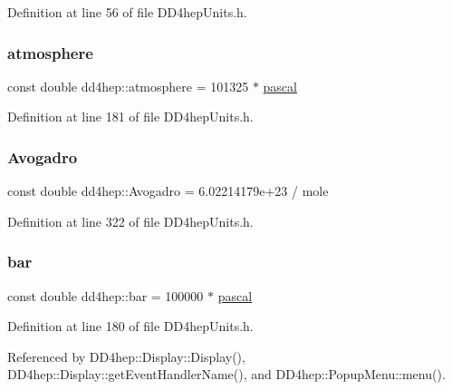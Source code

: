Definition at line 56 of file D\+D4hep\+Units.\+h.

\hypertarget{namespacedd4hep_a3907dd93dc8fc5b2f3b0fb9b92e46c5b}{}\label{namespacedd4hep_a3907dd93dc8fc5b2f3b0fb9b92e46c5b} 
\subsubsection{\texorpdfstring{atmosphere}{atmosphere}}
{\footnotesize\ttfamily const double dd4hep\+::atmosphere = 101325 $\ast$ \hyperlink{_d_d4hep_units_8h_ad7133dd2108e078049b3603f686028d9}{pascal}\hspace{0.3cm}{\ttfamily [static]}}



Definition at line 181 of file D\+D4hep\+Units.\+h.

\hypertarget{namespacedd4hep_a674bc3e17add397df97b4b8222ad8a1e}{}\label{namespacedd4hep_a674bc3e17add397df97b4b8222ad8a1e} 
\subsubsection{\texorpdfstring{Avogadro}{Avogadro}}
{\footnotesize\ttfamily const double dd4hep\+::\+Avogadro = 6.\+02214179e+23 / mole\hspace{0.3cm}{\ttfamily [static]}}



Definition at line 322 of file D\+D4hep\+Units.\+h.

\hypertarget{namespacedd4hep_a77aaec852fdd6717b70a272fe4ef0473}{}\label{namespacedd4hep_a77aaec852fdd6717b70a272fe4ef0473} 
\subsubsection{\texorpdfstring{bar}{bar}}
{\footnotesize\ttfamily const double dd4hep\+::bar = 100000 $\ast$ \hyperlink{_d_d4hep_units_8h_ad7133dd2108e078049b3603f686028d9}{pascal}\hspace{0.3cm}{\ttfamily [static]}}



Definition at line 180 of file D\+D4hep\+Units.\+h.



Referenced by D\+D4hep\+::\+Display\+::\+Display(), D\+D4hep\+::\+Display\+::get\+Event\+Handler\+Name(), and D\+D4hep\+::\+Popup\+Menu\+::menu().

